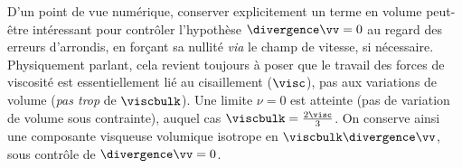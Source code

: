 D'un point de vue numérique, conserver explicitement un terme en volume peut-être intéressant pour contrôler l'hypothèse $\divergence \vv = 0$ au regard des erreurs d'arrondis, en forçant sa nullité \emph{via} le champ de vitesse, si nécessaire. Physiquement parlant, cela revient toujours à poser que le travail des forces de viscosité est essentiellement lié au cisaillement ($\visc$), pas aux variations de volume (\emph{pas trop} de $\viscbulk$). Une limite $\nu = 0$ est atteinte (pas de variation de volume sous contrainte), auquel cas $\viscbulk = \frac{2\visc}{3}$. On conserve ainsi une composante visqueuse volumique isotrope en $\viscbulk \divergence \vv$, sous contrôle de $\divergence \vv = 0$.



